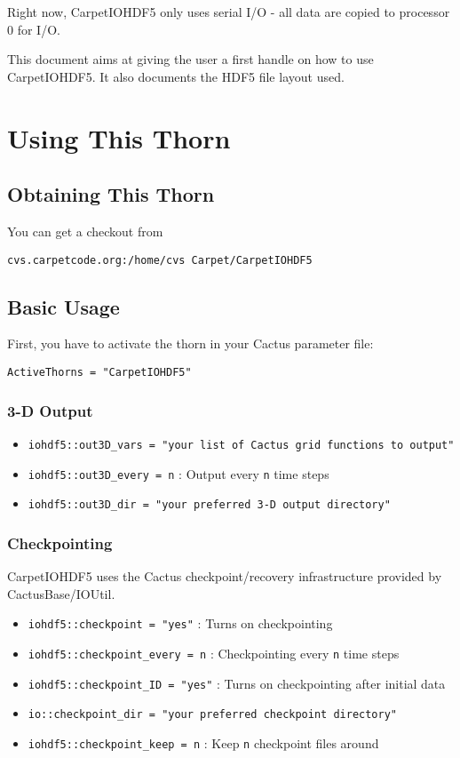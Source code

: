 Right now, CarpetIOHDF5 only uses serial I/O - all data are copied to processor 0 for I/O.

This document aims at giving the user a first handle on how to use
CarpetIOHDF5. It also documents the HDF5 file layout used.


\section{Using This Thorn}


\subsection{Obtaining This Thorn}

You can get a checkout from 

{\tt cvs.carpetcode.org:/home/cvs Carpet/CarpetIOHDF5}

\subsection{Basic Usage}

First, you have to activate the thorn in your Cactus parameter file:

{\tt ActiveThorns = "CarpetIOHDF5"}

\subsubsection{3-D Output}

\begin{itemize}
  \item {\tt iohdf5::out3D\_vars = "your list of Cactus grid functions to output"}
  \item {\tt iohdf5::out3D\_every = n} : Output every {\tt n} time steps
  \item {\tt iohdf5::out3D\_dir = "your preferred 3-D output directory"}
\end{itemize}

\subsubsection{Checkpointing}

CarpetIOHDF5 uses the Cactus checkpoint/recovery infrastructure provided by
CactusBase/IOUtil.

\begin{itemize}
  \item {\tt iohdf5::checkpoint = "yes"} : Turns on checkpointing
  \item {\tt iohdf5::checkpoint\_every = n} : Checkpointing every {\tt n} time steps
  \item {\tt iohdf5::checkpoint\_ID = "yes"} : Turns on checkpointing after initial data
  \item {\tt io::checkpoint\_dir = "your preferred checkpoint directory"} 
  \item  {\tt iohdf5::checkpoint\_keep = n} : Keep {\tt n} checkpoint files around
\end{itemize}


